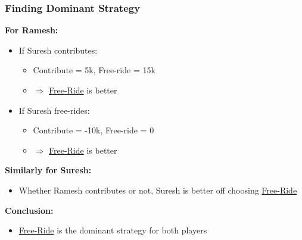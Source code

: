 \begin{frame}[fragile]\frametitle{Finding Dominant Strategy}

\textbf{For Ramesh:}

\begin{itemize}
  \item If Suresh contributes:
  \begin{itemize}
    \item Contribute = 5k, Free-ride = 15k
    \item $\Rightarrow$ \underline{Free-Ride} is better
  \end{itemize}
  
  \item If Suresh free-rides:
  \begin{itemize}
    \item Contribute = -10k, Free-ride = 0
    \item $\Rightarrow$ \underline{Free-Ride} is better
  \end{itemize}
\end{itemize}

\vspace{6pt}

\textbf{Similarly for Suresh:}

\begin{itemize}
  \item Whether Ramesh contributes or not, Suresh is better off choosing \underline{Free-Ride}
\end{itemize}

\vspace{8pt}

\textbf{Conclusion:}
\begin{itemize}
  \item \underline{Free-Ride} is the dominant strategy for both players
\end{itemize}

\end{frame}

